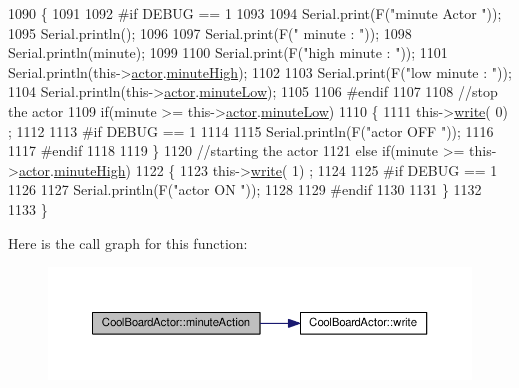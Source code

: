 \begin{DoxyCode}
1090 \{
1091 
1092 \textcolor{preprocessor}{#if DEBUG == 1}
1093     
1094     Serial.print(F(\textcolor{stringliteral}{"minute Actor "}));
1095     Serial.println();
1096 
1097     Serial.print(F(\textcolor{stringliteral}{" minute : "}));
1098     Serial.println(minute);
1099 
1100     Serial.print(F(\textcolor{stringliteral}{"high minute : "}));
1101     Serial.println(this->\hyperlink{class_cool_board_actor_a8f190db9f7a39fddbcef7f152da970e9}{actor}.\hyperlink{struct_cool_board_actor_1_1state_a4bff3d61ead74adb60be224764b93006}{minuteHigh});
1102 
1103     Serial.print(F(\textcolor{stringliteral}{"low minute : "}));
1104     Serial.println(this->\hyperlink{class_cool_board_actor_a8f190db9f7a39fddbcef7f152da970e9}{actor}.\hyperlink{struct_cool_board_actor_1_1state_acbcc2902331fd9d757cd475eb403bdd9}{minuteLow});
1105 
1106 \textcolor{preprocessor}{#endif}
1107 
1108     \textcolor{comment}{//stop the actor    }
1109     \textcolor{keywordflow}{if}(minute >= this->\hyperlink{class_cool_board_actor_a8f190db9f7a39fddbcef7f152da970e9}{actor}.\hyperlink{struct_cool_board_actor_1_1state_acbcc2902331fd9d757cd475eb403bdd9}{minuteLow})
1110     \{
1111         this->\hyperlink{class_cool_board_actor_a958786ff01ea1056ee72c72d439f86da}{write}( 0) ;
1112 
1113 \textcolor{preprocessor}{    #if DEBUG == 1 }
1114 
1115         Serial.println(F(\textcolor{stringliteral}{"actor OFF "}));
1116 
1117 \textcolor{preprocessor}{    #endif  }
1118 
1119     \}   
1120     \textcolor{comment}{//starting the actor}
1121     \textcolor{keywordflow}{else} \textcolor{keywordflow}{if}(minute >= this->\hyperlink{class_cool_board_actor_a8f190db9f7a39fddbcef7f152da970e9}{actor}.\hyperlink{struct_cool_board_actor_1_1state_a4bff3d61ead74adb60be224764b93006}{minuteHigh})
1122     \{
1123         this->\hyperlink{class_cool_board_actor_a958786ff01ea1056ee72c72d439f86da}{write}( 1) ;
1124 
1125 \textcolor{preprocessor}{    #if DEBUG == 1 }
1126 
1127         Serial.println(F(\textcolor{stringliteral}{"actor ON "}));
1128 
1129 \textcolor{preprocessor}{    #endif  }
1130 
1131     \}
1132 
1133 \} 
\end{DoxyCode}
Here is the call graph for this function\+:\nopagebreak
\begin{figure}[H]
\begin{center}
\leavevmode
\includegraphics[width=350pt]{dc/d69/class_cool_board_actor_af000944ce0b9abb9c6ee4b8fe839fb36_cgraph}
\end{center}
\end{figure}
